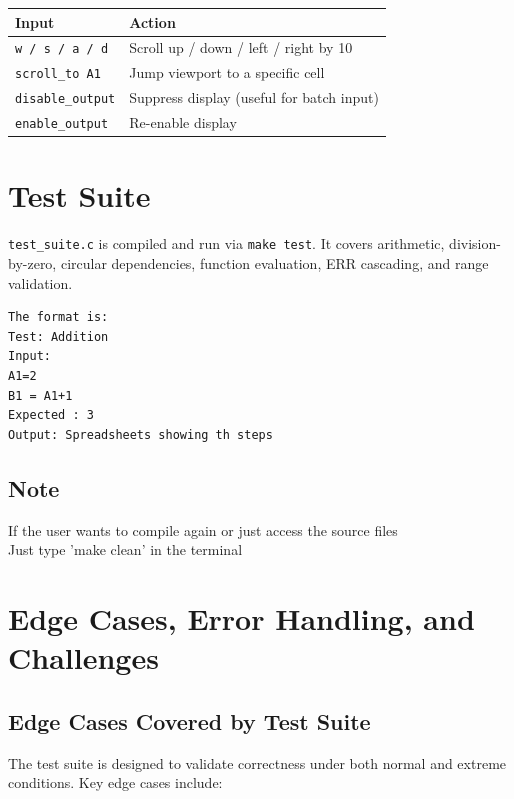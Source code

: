 \documentclass[11pt,a4paper]{article}
\begin{document}
\begin{center}
\begin{tabular}{|l|l|}
\hline
\textbf{Input} & \textbf{Action} \\
\hline
\texttt{w / s / a / d}   & Scroll up / down / left / right by 10 \\
\texttt{scroll\_to A1}   & Jump viewport to a specific cell \\
\texttt{disable\_output} & Suppress display (useful for batch input) \\
\texttt{enable\_output}  & Re-enable display \\
\hline
\end{tabular}
\end{center}

\section{Test Suite}

\texttt{test\_suite.c} is compiled and run via \texttt{make test}. It covers arithmetic, division-by-zero, circular dependencies, function evaluation, ERR cascading, and range validation.

\begin{verbatim}
The format is:
Test: Addition 
Input:
A1=2
B1 = A1+1
Expected : 3
Output: Spreadsheets showing th steps
\end{verbatim}

\subsection*{Note}
If the user wants to compile again or just access the source files \\
Just type 'make clean' in the terminal

\section{Edge Cases, Error Handling, and Challenges}

\subsection{Edge Cases Covered by Test Suite}

The test suite is designed to validate correctness under both normal and extreme conditions. Key edge cases include:
\end{document}
